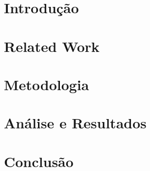 \documentclass[conference]{IEEEtran}
\begin{document}
\section{Introdução}

\section{Related Work}

\section{Metodologia}

\section{Análise e Resultados}

\section{Conclusão}
\end{document}
